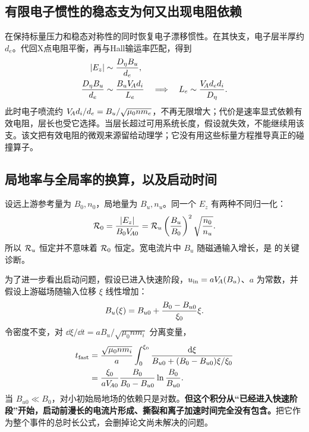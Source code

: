 \subsection{有限电子惯性的稳态支为何又出现电阻依赖}
\citet{Malyshkin2009}在保持标量压力和稳态对称性的同时恢复电子漂移惯性。在其快支，电子层半厚约 $d_e$。代回X点电阻平衡，再与Hall输运率匹配，得到
\begin{align}
|E_z|&\sim {D_\eta B_u\over d_e},\\
{D_\eta B_u\over d_e}&\sim{B_uV_{\!A}d_i\over L_e}
\quad\Longrightarrow\quad
L_e\sim {V_{\!A}d_ed_i\over D_\eta}.
\end{align}
此时电子喷流约 $V_{\!A} d_i/d_e=B_u/\sqrt{\mu_0nm_e}$，不再无限增大；代价是速率显式依赖有效电阻，层长也受它选择。当层长超过可用系统长度，假设就失效，不能继续用该支。该文把有效电阻的微观来源留给动理学；它没有用这些标量方程推导真正的碰撞算子。

\subsection{局地率与全局率的换算，以及启动时间}
设远上游参考量为 $B_0,n_0$，局地量为 $B_u,n_u$。同一个 $E_z$ 有两种不同归一化：
\begin{equation}
\mathcal R_0={|E_z|\over B_0V_{\!A0}}
=\mathcal R_u\left({B_u\over B_0}\right)^2
\sqrt{n_0\over n_u}.
\end{equation}
所以 $\mathcal R_u$ 恒定并不意味着 $\mathcal R_0$ 恒定。宽电流片中 $B_u$ 随磁通输入增长，是 \citet{Shay2004} 的关键诊断。

为了进一步看出启动问题，假设已进入快速阶段，$u_{\rm in}=aV_{\!A}(B_u)$、$a$ 为常数，并假设上游磁场随输入位移 $\xi$ 线性增加：
\begin{equation}
B_u(\xi)=B_{u0}+{B_0-B_{u0}\over\xi_0}\xi.
\end{equation}
令密度不变，对 $\dd\xi/\dd t=aB_u/\sqrt{\mu_0nm_i}$ 分离变量，
\begin{align}
t_{\rm fast}&={\sqrt{\mu_0nm_i}\over a}
\int_0^{\xi_0}{\mathrm d\xi\over B_{u0}+(B_0-B_{u0})\xi/\xi_0}\\
&={\xi_0\over aV_{\!A0}}{B_0\over B_0-B_{u0}}
\ln{B_0\over B_{u0}}.
\end{align}
当 $B_{u0}\ll B_0$，对小初始局地场的依赖只是对数。\textbf{但这个积分从“已经进入快速阶段”开始，启动前漫长的电流片形成、撕裂和离子加速时间完全没有包含。}把它作为整个事件的总时长公式，会删掉论文尚未解决的问题。

